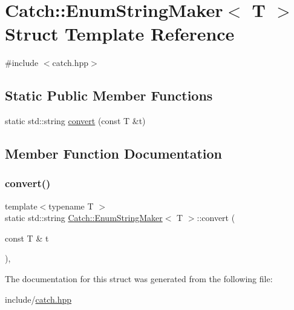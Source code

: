 \hypertarget{structCatch_1_1EnumStringMaker}{}\section{Catch\+:\+:Enum\+String\+Maker$<$ T $>$ Struct Template Reference}
\label{structCatch_1_1EnumStringMaker}


{\ttfamily \#include $<$catch.\+hpp$>$}

\subsection*{Static Public Member Functions}
\begin{DoxyCompactItemize}
\item 
static std\+::string \mbox{\hyperlink{structCatch_1_1EnumStringMaker_a2a7b44b992157c5203a0d134e5029b86}{convert}} (const T \&t)
\end{DoxyCompactItemize}


\subsection{Member Function Documentation}
\mbox{\label{structCatch_1_1EnumStringMaker_a2a7b44b992157c5203a0d134e5029b86}} 
\subsubsection{\texorpdfstring{convert()}{convert()}}
{\footnotesize\ttfamily template$<$typename T $>$ \\
static std\+::string \mbox{\hyperlink{structCatch_1_1EnumStringMaker}{Catch\+::\+Enum\+String\+Maker}}$<$ T $>$\+::convert (\begin{DoxyParamCaption}\item[{const T \&}]{t }\end{DoxyParamCaption})\hspace{0.3cm}{\ttfamily [inline]}, {\ttfamily [static]}}



The documentation for this struct was generated from the following file\+:\begin{DoxyCompactItemize}
\item 
include/\mbox{\hyperlink{catch_8hpp}{catch.\+hpp}}\end{DoxyCompactItemize}
